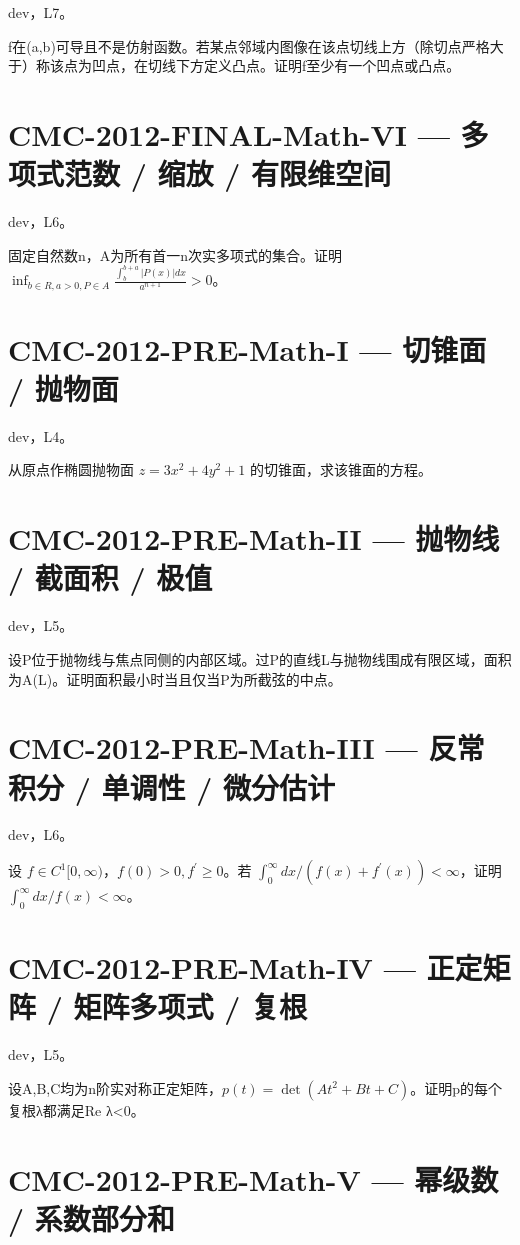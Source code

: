 \documentclass[UTF8]{ctexart}
\begin{document}
dev，L7。

f在(a,b)可导且不是仿射函数。若某点邻域内图像在该点切线上方（除切点严格大于）称该点为凹点，在切线下方定义凸点。证明f至少有一个凹点或凸点。

\section*{CMC-2012-FINAL-Math-VI — 多项式范数 / 缩放 / 有限维空间}

dev，L6。

固定自然数n，A为所有首一n次实多项式的集合。证明 $\inf_{b\in R,a>0,P\in A}\frac{\int_b^{b+a}|P(x)|dx}{a^{n+1}}>0$。

\section*{CMC-2012-PRE-Math-I — 切锥面 / 抛物面}

dev，L4。

从原点作椭圆抛物面 $z=3x^2+4y^2+1$ 的切锥面，求该锥面的方程。

\section*{CMC-2012-PRE-Math-II — 抛物线 / 截面积 / 极值}

dev，L5。

设P位于抛物线与焦点同侧的内部区域。过P的直线L与抛物线围成有限区域，面积为A(L)。证明面积最小时当且仅当P为所截弦的中点。

\section*{CMC-2012-PRE-Math-III — 反常积分 / 单调性 / 微分估计}

dev，L6。

设 $f\in C^1[0,\infty)$，$f(0)>0,f^{\prime}\ge0$。若 $\int_0^\infty dx/(f(x)+f^{\prime}(x))<\infty$，证明 $\int_0^\infty dx/f(x)<\infty$。

\section*{CMC-2012-PRE-Math-IV — 正定矩阵 / 矩阵多项式 / 复根}

dev，L5。

设A,B,C均为n阶实对称正定矩阵，$p(t)=\det(At^2+Bt+C)$。证明p的每个复根λ都满足Re λ<0。

\section*{CMC-2012-PRE-Math-V — 幂级数 / 系数部分和}
\end{document}
